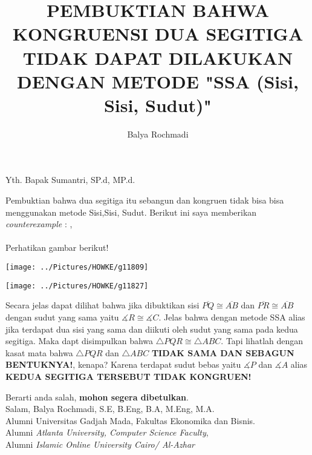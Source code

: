 \documentclass[12pt,a4paper]{article}
\author{Balya Rochmadi}
\title{PEMBUKTIAN BAHWA KONGRUENSI DUA SEGITIGA TIDAK DAPAT DILAKUKAN DENGAN METODE "SSA (Sisi, Sisi, Sudut)"}
\begin{document}
	\maketitle
	\paragraph*{}
	Yth. Bapak Sumantri, SP.d, MP.d.
	
	Pembuktian bahwa dua segitiga itu sebangun dan kongruen tidak bisa bisa menggunakan metode Sisi,Sisi, Sudut. Berikut ini saya memberikan \textit{counterexample} : ,
	
	
	
	\paragraph*{}
		Perhatikan gambar berikut!
	\begin{center}
	\texttt{[image: ../Pictures/HOWKE/g11809]}
	\end{center}

	\begin{center}
	\texttt{[image: ../Pictures/HOWKE/g11827]}
	\end{center}
	
	Secara jelas dapat dilihat bahwa jika dibuktikan sisi $\overline{PQ} \cong \overline{AB}$ dan $\overline{PR} \cong \overline{AB}$ dengan sudut yang sama yaitu $\measuredangle R \cong \measuredangle C$. Jelas bahwa dengan metode SSA alias jika terdapat dua sisi yang sama dan diikuti oleh sudut yang sama pada kedua segitiga. Maka dapt disimpulkan bahwa $\triangle PQR \cong \triangle ABC$. Tapi lihatlah dengan kasat mata bahwa $\triangle PQR$ dan $\triangle ABC$ \textbf{TIDAK SAMA DAN SEBAGUN BENTUKNYA!}, kenapa? Karena terdapat sudut bebas yaitu $\measuredangle P$ dan $\measuredangle A $ alias\textbf{ KEDUA SEGITIGA TERSEBUT TIDAK KONGRUEN!}
	
	Berarti anda salah, \textbf{mohon segera dibetulkan}.\\
	
	Salam,
	Balya Rochmadi, S.E, B.Eng, B.A, M.Eng, M.A.\\
	Alumni Universitas Gadjah Mada, Fakultas Ekonomika dan Bisnis.\\
	Alumni \textit{Atlanta University, Computer Science Faculty},\\
	Alumni \textit{Islamic Online University Cairo/ Al-Azhar}\\
	
	
	
	
	
\end{document}

